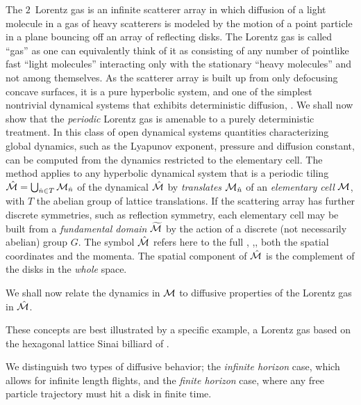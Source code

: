 \documentclass[aps,pre,preprint,groupedaddress, floatfix]{revtex4-1}
\begin{document}
The $2$\dmn\ Lorentz gas is an infinite scatterer array in which
diffusion of a light molecule in a gas of heavy scatterers is modeled
by the motion of a point particle in a plane bouncing off an array of
reflecting disks.  The Lorentz gas is called ``gas'' as one can
equivalently think of it as consisting of any number of pointlike fast
``light molecules'' interacting only with the stationary ``heavy
molecules'' and not among themselves.  As the scatterer array is built
up from only defocusing concave surfaces, it is a pure hyperbolic
system, and one of the simplest nontrivial dynamical systems that
exhibits deterministic diffusion, .
We shall now show that the {\em periodic} Lorentz gas is amenable to a
purely deterministic treatment.  In this class of open dynamical
systems quantities characterizing global dynamics, such as the
Lyapunov exponent, pressure and diffusion constant, can be computed
from the dynamics restricted to the elementary cell.  The method
applies to any hyperbolic dynamical system that is a periodic tiling
$\hat {{\cal M}}=\bigcup_{ \hat n \in T} {\cal M}_{\hat n}$ of the dynamical {\statesp} $\hat {{\cal M}}$
by {\em translates} ${\cal M}_{\hat n}$ of an {\em elementary cell} ${\cal M}$,
with $T$ the abelian group of lattice translations.  If the scattering
array has further discrete symmetries, such as reflection symmetry,
each elementary cell may be built from a {\em fundamental domain}
${\widetilde {{\cal M}}}$ by the action of a discrete (not necessarily
abelian) group $G$.  The symbol $\hat {{\cal M}}$ refers here to the full
{\statesp}, \ie,, both the spatial coordinates and the momenta.  The
spatial component of $\hat {{\cal M}}$ is the complement of the disks in the {\em
whole} space.

We shall now relate the dynamics in ${\cal M}$ to diffusive properties of
the Lorentz gas in $\hat {{\cal M}}$.

These concepts are best illustrated by a specific example, a Lorentz
gas based on the hexagonal lattice Sinai billiard of
.

We distinguish two types of diffusive behavior; the {\em infinite
horizon} case, which allows for infinite length flights, and the {\em
finite horizon} case, where any free particle trajectory must hit a
disk in finite time. 
\end{document}
